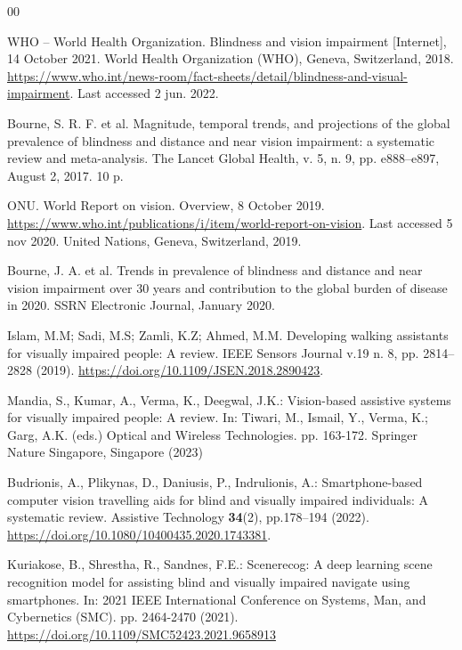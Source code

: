 \documentclass[preprint,12pt]{elsarticle}
\begin{document}
\begin{thebibliography}{00}


WHO – World Health Organization. Blindness and vision impairment [Internet], 14 October 2021. World Health Organization (WHO), Geneva, Switzerland, 2018. \url{https://www.who.int/news-room/fact-sheets/detail/blindness-and-visual-impairment}. Last accessed 2 jun. 2022.

Bourne, S. R. F. et al. Magnitude, temporal trends, and projections of the global prevalence of blindness and distance and near vision impairment: a systematic review and meta-analysis. The Lancet Global Health, v. 5, n. 9, pp. e888--e897, August 2, 2017. 10 p.

ONU. World Report on vision. Overview, 8 October 2019. \url{https://www.who.int/publications/i/item/world-report-on-vision}. Last accessed 5 nov 2020. United Nations, Geneva, Switzerland, 2019.

Bourne, J. A. et al. Trends in prevalence of blindness and distance and near vision impairment over 30 years and contribution to the global burden of disease in 2020. SSRN Electronic Journal, January 2020.

Islam, M.M; Sadi, M.S; Zamli, K.Z; Ahmed, M.M. Developing walking assistants for visually impaired people: A review. IEEE Sensors Journal v.19 n. 8, pp. 2814--2828 (2019). \url{https://doi.org/10.1109/JSEN.2018.2890423}.

Mandia, S., Kumar, A., Verma, K., Deegwal, J.K.: Vision-based assistive systems for visually impaired people: A review. In: Tiwari, M., Ismail, Y., Verma, K.; Garg, A.K. (eds.) Optical and Wireless Technologies. pp. 163-172. Springer Nature Singapore, Singapore (2023)

Budrionis, A., Plikynas, D., Daniusis, P., Indrulionis, A.: Smartphone-based computer vision travelling aids for blind and visually impaired individuals: A systematic review. Assistive Technology \textbf{34}(2), pp.178--194 (2022). \url{https://doi.org/10.1080/10400435.2020.1743381}.

Kuriakose, B., Shrestha, R., Sandnes, F.E.: Scenerecog: A deep learning scene recognition model for assisting blind and visually impaired navigate using smartphones. In: 2021 IEEE International Conference on Systems, Man, and Cybernetics (SMC). pp. 2464-2470 (2021). \url{https://doi.org/10.1109/SMC52423.2021.9658913}


\end{thebibliography}
\end{document}

